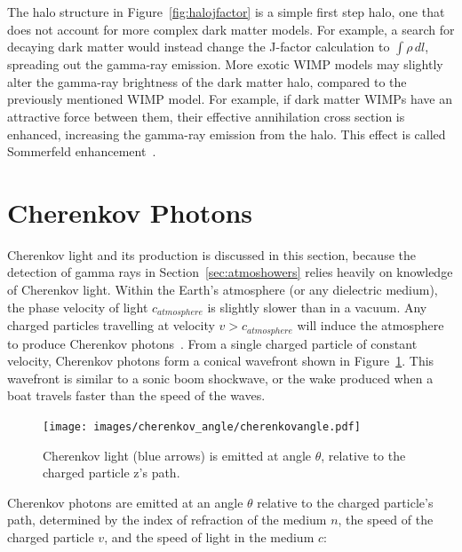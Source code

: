   The halo structure in Figure~\ref{fig:halojfactor} is a simple first step halo, one that does not account for more complex dark matter models.
  For example, a search for decaying dark matter would instead change the J-factor calculation to $\int \rho \, dl$, spreading out the gamma-ray emission.
  More exotic WIMP models may slightly alter the gamma-ray brightness of the dark matter halo, compared to the previously mentioned WIMP model.
  For example, if dark matter WIMPs have an attractive force between them, their effective annihilation cross section is enhanced, increasing the gamma-ray emission from the halo.
  This effect is called Sommerfeld enhancement~\cite{sommerfeld}.
    
  
  \FloatBarrier
    
\section{Cherenkov Photons}\label{sec:cherenkov}

  Cherenkov light and its production is discussed in this section, because the detection of gamma rays in Section~\ref{sec:atmoshowers} relies heavily on knowledge of Cherenkov light.
  Within the Earth's atmosphere (or any dielectric medium), the phase velocity of light $c_{atmosphere}$ is slightly slower than in a vacuum.
  Any charged particles travelling at velocity $v > c_{atmosphere}$ will induce the atmosphere to produce Cherenkov photons~\cite{cherenkov}.
  From a single charged particle of constant velocity, Cherenkov photons form a conical wavefront shown in Figure~\ref{fig:cherenkovangle}.
  This wavefront is similar to a sonic boom shockwave, or the wake produced when a boat travels faster than the speed of the waves.

  \begin{figure}[!t]
    \centering
    \texttt{[image: images/cherenkov\_angle/cherenkovangle.pdf]}
    \caption[Cherenkov Emission Angle]{
      Cherenkov light (blue arrows) is emitted at angle $\theta$, relative to the charged particle z's path.
    }
    \label{fig:cherenkovangle}
  \end{figure}

  Cherenkov photons are emitted at an angle $\theta$ relative to the charged particle's path, determined by the index of refraction of the medium $n$, the speed of the charged particle $v$, and the speed of light in the medium $c$:

